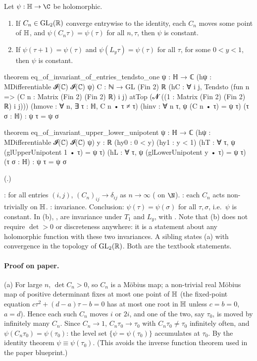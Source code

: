 \begin{theorem}\label{ch16:thm:shimizu}
Let $\psi:\chsixteenH\to\C$ be holomorphic.
\begin{enumerate}[label=(\alph*)]
\item If $C_n\in\mathrm{GL}_2(\mathbb{R})$ converge entrywise to the identity, each $C_n$ moves some point of $\mathbb{H}$, and
  $\psi(C_n\tau)=\psi(\tau)$ for all $n,\tau$, then $\psi$ is constant.
\item If $\psi(\tau+1)=\psi(\tau)$ and $\psi(L_y\tau)=\psi(\tau)$ for all $\tau$, for some $0<y<1$, then $\psi$ is
  constant.
\end{enumerate}
\end{theorem}
\begin{leancode}
theorem eq_of_invariant_of_entries_tendsto_one {ψ : ℍ → ℂ}
    (hψ : MDifferentiable 𝓘(ℂ) 𝓘(ℂ) ψ) {C : ℕ → GL (Fin 2) ℝ}
    (hC : ∀ i j, Tendsto (fun n => (C n : Matrix (Fin 2) (Fin 2) ℝ) i j) atTop
      (𝓝 ((1 : Matrix (Fin 2) (Fin 2) ℝ) i j)))
    (hmove : ∀ n, ∃ τ : ℍ, C n • τ ≠ τ) (hinv : ∀ n τ, ψ (C n • τ) = ψ τ) (τ σ : ℍ) :
    ψ τ = ψ σ

theorem eq_of_invariant_upper_lower_unipotent {ψ : ℍ → ℂ} (hψ : MDifferentiable 𝓘(ℂ) 𝓘(ℂ) ψ)
    {y : ℝ} (hy0 : 0 < y) (hy1 : y < 1) (hT : ∀ τ, ψ (glUpperUnipotent 1 • τ) = ψ τ)
    (hL : ∀ τ, ψ (glLowerUnipotent y • τ) = ψ τ) (τ σ : ℍ) : ψ τ = ψ σ
\end{leancode}
(.)
\begin{dictionary}
: for all entries $(i,j)$, $(C_n)_{ij}\to\delta_{ij}$ as $n\to\infty$ ( on $\N$).  :
each $C_n$ acts non-trivially on $\mathbb{H}$.  : invariance.  Conclusion: $\psi(\tau)=\psi(\sigma)$ for all
$\tau,\sigma$, i.e.\ $\psi$ is constant.  In (b), ,  are invariance under $T_1$ and $L_y$, with
.  Note that (b) does not require $\det>0$ or discreteness anywhere: it is a statement about any
holomorphic function with these two invariances.  A sibling  states (a) with
convergence in the topology of $\mathrm{GL}_2(\mathbb{R})$.  Both are the textbook statements.
\end{dictionary}
\paragraph{Proof on paper.}  (a) For large $n$, $\det C_n>0$, so $C_n$ is a M\"obius map; a non-trivial real
M\"obius map of positive determinant fixes at most one point of $\mathbb{H}$ (the fixed-point equation
$c\tau^2+(d-a)\tau-b=0$ has at most one root in $\mathbb{H}$ unless $c=b=0$, $a=d$).  Hence each such $C_n$ moves
$i$ or $2i$, and one of the two, say $\tau_0$, is moved by infinitely many $C_n$.  Since $C_n\to1$, $C_n\tau_0\to\tau_0$
with $C_n\tau_0\ne\tau_0$ infinitely often, and $\psi(C_n\tau_0)=\psi(\tau_0)$: the level set
$\{\psi=\psi(\tau_0)\}$ accumulates at $\tau_0$.  By the identity theorem $\psi\equiv\psi(\tau_0)$.  (This avoids the
inverse function theorem used in the paper blueprint.)

